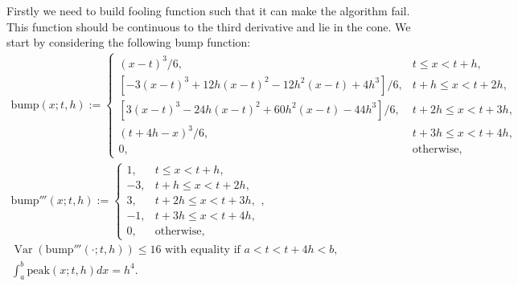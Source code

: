 \documentclass[draft]{iitthesis}
\DeclareMathOperator{\Var}{Var}
\theoremstyle{definition}
\theoremstyle{remark}
\begin{document}

Firstly we need to build fooling function such that it can make the algorithm fail. This function should be continuous to the third derivative and lie in the cone. We start by considering the following bump function:
\begin{subequations} \label{bumpfunction}
\begin{gather}
\text{bump}(x;t,h):= \begin{cases} \displaystyle (x-t)^3/6, & t \le x < t+h,\\[1ex]
\displaystyle [-3(x-t)^3+12h(x-t)^2-12h^2(x-t)+4h^3]/6, & t+h \le x < t+2h,\\[1ex]
\displaystyle [3(x-t)^3-24h(x-t)^2+60h^2(x-t)-44h^3]/6, & t+2h \le x < t+3h,\\[1ex]
\displaystyle (t+4h-x)^3/6, & t+3h \le x < t+4h,\\[1ex]
\displaystyle  0, & \text{otherwise},
\end{cases}
\\
\text{bump}'''(x;t,h):= \begin{cases} \displaystyle 1, & t \le x < t+h,\\[1ex]
\displaystyle -3, & t+h \le x < t+2h,\\[1ex]
\displaystyle 3, & t+2h \le x < t+3h,\\[1ex]
\displaystyle -1, & t+3h \le x < t+4h,\\[1ex]
\displaystyle  0, & \text{otherwise},
\end{cases}, \\
\Var(\text{bump}'''(\cdot;t,h))\le 16 \text{ with equality if } a<t<t+4h<b, \\
\int_{a}^{b}\text{peak}(x;t,h)dx=h^4.
\end{gather}
\end{subequations}
\end{document}
